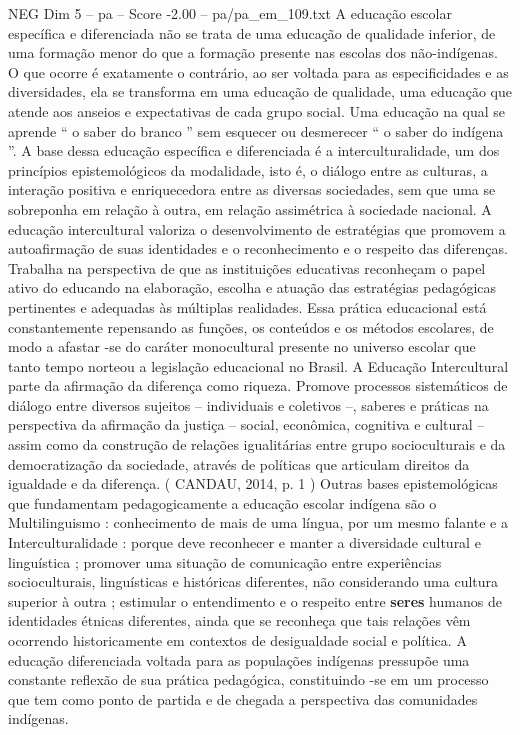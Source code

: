 \begin{textsample}{NEG Dim 5 – pa – Score -2.00 – pa/pa\_em\_109.txt}
A educação escolar específica e diferenciada não se trata de uma educação de qualidade inferior, de uma formação menor do que a formação presente nas escolas dos não-indígenas.
O que ocorre é exatamente o contrário, ao ser voltada para as especificidades e as diversidades, ela se transforma em uma educação de qualidade, uma educação que atende aos anseios e expectativas de cada grupo social.
Uma educação na qual se aprende “ o saber do branco ” sem esquecer ou desmerecer “ o saber do indígena ”.
A base dessa educação específica e diferenciada é a interculturalidade, um dos princípios epistemológicos da modalidade, isto é, o diálogo entre as culturas, a interação positiva e enriquecedora entre as diversas sociedades, sem que uma se sobreponha em relação à outra, em relação assimétrica à sociedade nacional.
A educação intercultural valoriza o desenvolvimento de estratégias que promovem a autoafirmação de suas identidades e o reconhecimento e o respeito das diferenças.
Trabalha na perspectiva de que as instituições educativas reconheçam o papel ativo do educando na elaboração, escolha e atuação das estratégias pedagógicas pertinentes e adequadas às múltiplas realidades.
Essa prática educacional está constantemente repensando as funções, os conteúdos e os métodos escolares, de modo a afastar -se do caráter monocultural presente no universo escolar que tanto tempo norteou a legislação educacional no Brasil.
A Educação Intercultural parte da afirmação da diferença como riqueza.
Promove processos sistemáticos de diálogo entre diversos sujeitos – individuais e coletivos –, saberes e práticas na perspectiva da afirmação da justiça – social, econômica, cognitiva e cultural – assim como da construção de relações igualitárias entre grupo socioculturais e da democratização da sociedade, através de políticas que articulam direitos da igualdade e da diferença. ( CANDAU, 2014, p. 1 ) Outras bases epistemológicas que fundamentam pedagogicamente a educação escolar indígena são o Multilinguismo : conhecimento de mais de uma língua, por um mesmo falante e a Interculturalidade : porque deve reconhecer e manter a diversidade cultural e linguística ; promover uma situação de comunicação entre experiências socioculturais, linguísticas e históricas diferentes, não considerando uma cultura superior à outra ; estimular o entendimento e o respeito entre \textbf{seres} humanos de identidades étnicas diferentes, ainda que se reconheça que tais relações vêm ocorrendo historicamente em contextos de desigualdade social e política.
A educação diferenciada voltada para as populações indígenas pressupõe uma constante reflexão de sua prática pedagógica, constituindo -se em um processo que tem como ponto de partida e de chegada a perspectiva das comunidades indígenas.

\end{textsample}

